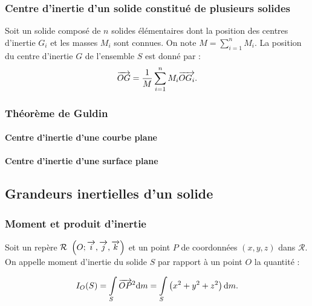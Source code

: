 \documentclass[10pt,fleqn]{article} %
\begin{document}
\subsubsection{Centre d'inertie d'un solide constitué de plusieurs solides}
Soit un solide composé de $n$ solides élémentaires dont la position des centres d'inertie $G_i$ et les masses $M_i$ sont connues. On note $M=\sum\limits_{i=1}^{n}M_i$.  La position du centre d'inertie $G$ de l'ensemble $S$ est donné par :
$$\overrightarrow{OG}=\dfrac{1}{M}\sum\limits_{i=1}^{n}M_i \overrightarrow{OG_i} .$$


\subsubsection{Théorème de Guldin}
\paragraph{Centre d'inertie d'une courbe plane}
\paragraph{Centre d'inertie d'une surface plane}

\subsection{Grandeurs inertielles d'un solide}
\subsubsection{Moment et produit d'inertie}
\begin{defi}
Soit un repère $\mathcal{R}_{}$ $\left(O;\overrightarrow{i},\overrightarrow{j},\overrightarrow{k} \right)$ et un point $P$ de coordonnées $\left(x,y,z\right)$ dans $\mathcal{R}$.  
On appelle moment d'inertie du solide $S$ par rapport à un point $O$ la quantité :

$$ I_O(S)=\int\limits_S \overrightarrow{OP}^2 \text{d} m = \int\limits_S \left( x^2 + y^2 + z^2 \right) \text{d} m.  $$

\end{defi}
\end{document}
